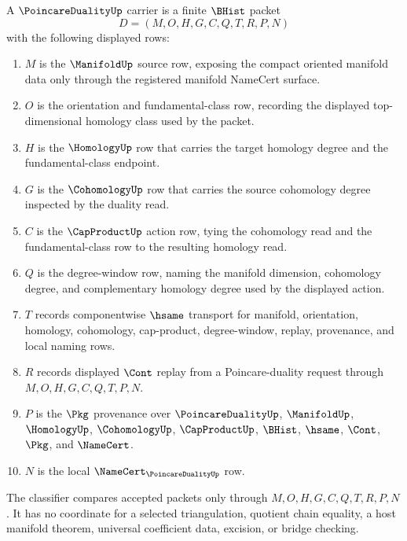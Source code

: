 \begin{definition}
\label{def:poincare-duality-carrier}
A $\PoincareDualityUp$ carrier is a finite $\BHist$ packet
$$
D=(M,O,H,G,C,Q,T,R,P,N)
$$
with the following displayed rows:
\begin{enumerate}
\item $M$ is the $\ManifoldUp$ source row, exposing the compact oriented manifold data only through the registered manifold NameCert surface.
\item $O$ is the orientation and fundamental-class row, recording the displayed top-dimensional homology class used by the packet.
\item $H$ is the $\HomologyUp$ row that carries the target homology degree and the fundamental-class endpoint.
\item $G$ is the $\CohomologyUp$ row that carries the source cohomology degree inspected by the duality read.
\item $C$ is the $\CapProductUp$ action row, tying the cohomology read and the fundamental-class row to the resulting homology read.
\item $Q$ is the degree-window row, naming the manifold dimension, cohomology degree, and complementary homology degree used by the displayed action.
\item $T$ records componentwise $\hsame$ transport for manifold, orientation, homology, cohomology, cap-product, degree-window, replay, provenance, and local naming rows.
\item $R$ records displayed $\Cont$ replay from a Poincare-duality request through $M,O,H,G,C,Q,T,P,N$.
\item $P$ is the $\Pkg$ provenance over $\PoincareDualityUp$, $\ManifoldUp$, $\HomologyUp$, $\CohomologyUp$, $\CapProductUp$, $\BHist$, $\hsame$, $\Cont$, $\Pkg$, and $\NameCert$.
\item $N$ is the local $\NameCert_{\PoincareDualityUp}$ row.
\end{enumerate}
The classifier compares accepted packets only through $M,O,H,G,C,Q,T,R,P,N$. It has no coordinate for a selected triangulation, quotient chain equality, a host manifold theorem, universal coefficient data, excision, or bridge checking.
\end{definition}

